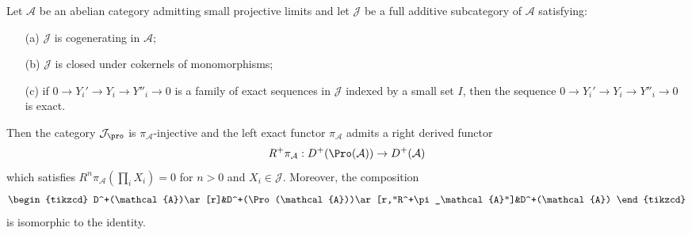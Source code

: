 \begin{proposition}\label{derived category derived functor of proj limit}
Let $\mathcal{A}$ be an abelian category admitting small projective limits and let $\mathcal{J}$ be a full additive subcategory of $\mathcal{A}$ satisfying:
\begin{enumerate}
    \item[(a)] $\mathcal{J}$ is cogenerating in $\mathcal{A}$;
    \item[(b)] $\mathcal{J}$ is closed under cokernels of monomorphisms;
    \item[(c)] if $0\to Y_i'\to Y_i\to Y''_i\to 0$ is a family of exact sequences in $\mathcal{J}$ indexed by a small set $I$, then the sequence $0\to Y_i'\to Y_i\to Y''_i\to 0$ is exact.
\end{enumerate}
Then the category $\mathcal{J}_{\pro}$ is $\pi_\mathcal{A}$-injective and the left exact functor $\pi_\mathcal{A}$ admits a right derived functor
\[R^+\pi_\mathcal{A}:D^+(\Pro(\mathcal{A}))\to D^+(\mathcal{A})\]
which satisfies $R^n\pi_\mathcal{A}(\prod_iX_i)=0$ for $n>0$ and $X_i\in\mathcal{J}$. Moreover, the composition
\[\begin{tikzcd}
D^+(\mathcal{A})\ar[r]&D^+(\Pro(\mathcal{A}))\ar[r,"R^+\pi_\mathcal{A}"]&D^+(\mathcal{A})
\end{tikzcd}\]
is isomorphic to the identity.
\end{proposition}
